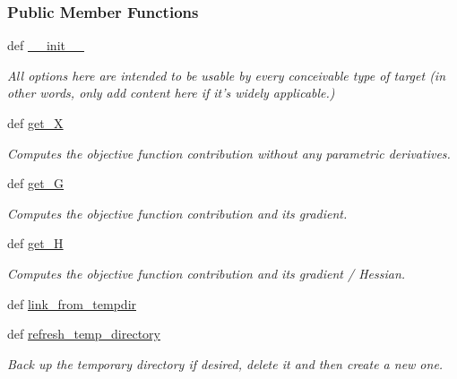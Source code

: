 \subsubsection*{\-Public \-Member \-Functions}
\begin{DoxyCompactItemize}
\item 
def \hyperlink{classforcebalance_1_1target_1_1Target_ab8f31f6e94e0fbd84f0ee54d326bb69a}{\-\_\-\-\_\-init\-\_\-\-\_\-}
\begin{DoxyCompactList}\small\item\em \-All options here are intended to be usable by every conceivable type of target (in other words, only add content here if it's widely applicable.) \end{DoxyCompactList}\item 
def \hyperlink{classforcebalance_1_1target_1_1Target_a606dd136f195c267c05a2455405e5949}{get\-\_\-\-X}
\begin{DoxyCompactList}\small\item\em \-Computes the objective function contribution without any parametric derivatives. \end{DoxyCompactList}\item 
def \hyperlink{classforcebalance_1_1target_1_1Target_afa8cc38c8bba8861c072e789717aa049}{get\-\_\-\-G}
\begin{DoxyCompactList}\small\item\em \-Computes the objective function contribution and its gradient. \end{DoxyCompactList}\item 
def \hyperlink{classforcebalance_1_1target_1_1Target_a1d2ee27fe86a09769c1816af23b09adb}{get\-\_\-\-H}
\begin{DoxyCompactList}\small\item\em \-Computes the objective function contribution and its gradient / \-Hessian. \end{DoxyCompactList}\item 
def \hyperlink{classforcebalance_1_1target_1_1Target_a5aa4958cea0a48138511567a076c5a82}{link\-\_\-from\-\_\-tempdir}
\item 
def \hyperlink{classforcebalance_1_1target_1_1Target_afe815eafab06ac92f10bbf4b88ad95c8}{refresh\-\_\-temp\-\_\-directory}
\begin{DoxyCompactList}\small\item\em \-Back up the temporary directory if desired, delete it and then create a new one. \end{DoxyCompactList}\item 

\end{DoxyCompactItemize}
